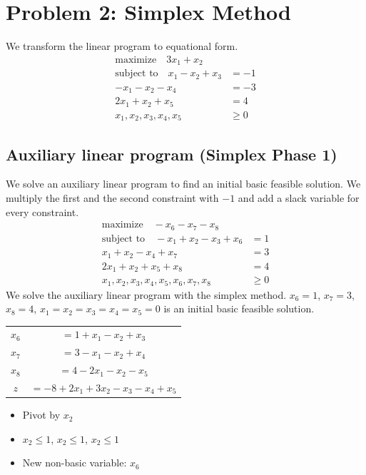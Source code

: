 \documentclass[12pt]{article}
\newcommand*\circled[1]{\tikz[baseline=(char.base)]{
            \node[shape=circle,draw,inner sep=2pt] (char) {#1};}}
\begin{document}
\newpage
\section*{Problem 2: Simplex Method}
We transform the linear program to equational form.
\begin{align*}
\text{maximize} \quad 3 x_1 + x_2& \\
\text{subject to} \quad  x_1 - x_2 + x_3 &= -1 \\
-x_1 - x_2 - x_4 &= -3 \\
2 x_1 + x_2 + x_5 &= 4 \\
x_1, x_2, x_3, x_4, x_5 &\geq 0
\end{align*}

\subsection*{Auxiliary linear program (Simplex Phase 1)}
We solve an auxiliary linear program to find an initial basic feasible solution. We multiply the first and the second constraint with $-1$ and add a slack variable for every constraint.
\begin{align*}
\text{maximize} \quad -x_6 - x_7 - x_8 & \\
\text{subject to} \quad  -x_1 + x_2 - x_3 + x_6 &= 1 \\
x_1 + x_2 - x_4 + x_7 &= 3 \\
2 x_1 + x_2 + x_5 + x_8 &= 4 \\
x_1, x_2, x_3, x_4, x_5, x_6, x_7, x_8 &\geq 0
\end{align*}
We solve the auxiliary linear program with the simplex method. $x_6 = 1$, $x_7 = 3$, $x_8=4$, $x_1=x_2=x_3=x_4=x_5=0$ is an initial basic feasible solution.

\begin{framed}
\begin{minipage}[t]{0.5\textwidth}
\vspace{0.25cm}
\begin{tabular}{c | c}
$x_6 $ & $= 1 + x_1 - x_2 + x_3$ \\
$x_7 $ & $= 3 - x_1 - x_2 + x_4$ \\
$x_8 $ & $= 4 - 2x_1 - x_2 - x_5$ \\
\hline
$z $ & $=-8 + 2 x_1 + 3 x_2 - x_3 - x_4 + x_5$
\end{tabular}
\end{minipage}
\begin{minipage}[t]{0.5\textwidth}
\vspace{0.1cm}
\begin{itemize}
	\item Pivot by $x_2$
	\item \circled{$x_6$} $x_2 \leq 1$, \circled{$x_7$} $x_2 \leq 1$, \circled{$x_8$} $x_2 \leq 1$
	\item New non-basic variable: $x_6$
\end{itemize}
\vspace{0.0cm}
\end{minipage}
\end{framed}
\end{document}

